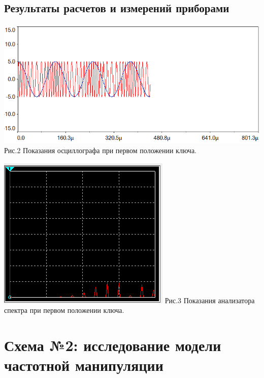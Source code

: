 \documentclass[11pt]{article}
\begin{document}
\subsection{Результаты расчетов и измерений приборами}
\begin{center}
    \includegraphics[width=1\linewidth]{img/osc1.png}
        Рис.2 Показания осциллографа при первом положении ключа.
\end{center}

\begin{center}
    \includegraphics[width=1\linewidth]{img/chast1.png}
        Рис.3 Показания анализатора спектра при первом положении ключа.
\end{center}


\newpage
\section{Схема №2: исследование модели частотной манипуляции}
\end{document}
